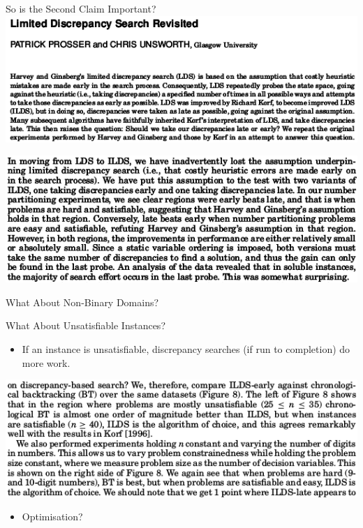 \documentclass{beamer}
\begin{document}
\begin{frame}{So is the Second Claim Important?}
    \centering\includegraphics*[keepaspectratio=true,scale=0.4]{images/ldsr-paper.png}

    \vspace{2em}

    \centering\includegraphics*[keepaspectratio=true,scale=0.4]{images/ldsr-conclusion.png}

    \vspace{0em}

\end{frame}

\begin{frame}{What About Non-Binary Domains?}
\end{frame}

\begin{frame}{What About Unsatisfiable Instances?}

    \begin{itemize}
        \item If an instance is unsatisfiable, discrepancy searches (if run to completion) do more
            work.
    \end{itemize}

    \vspace{1em}

    \centering\includegraphics*[keepaspectratio=true,scale=0.4]{images/ldsr-bt.png}

    \vspace{1em}

    \begin{itemize}
        \item Optimisation?
    \end{itemize}

\end{frame}
\end{document}
